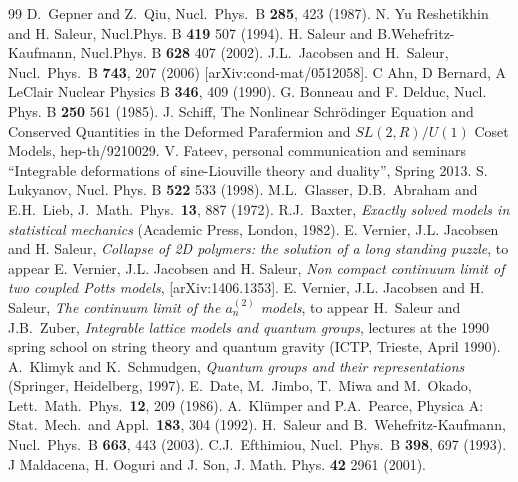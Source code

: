 \documentclass[11pt]{article}
\begin{document}
\begin{thebibliography}{99}
 D.\ Gepner and Z.\ Qiu,
 Nucl.\ Phys.\ B {\bf 285}, 423 (1987).
  N. Yu Reshetikhin and H. Saleur, Nucl.Phys. B {\bf 419} 507 (1994).
   H. Saleur and  B.Wehefritz-Kaufmann, Nucl.Phys. B {\bf 628} 407 (2002).
 J.L.\ Jacobsen and H.\ Saleur,
 Nucl.\ Phys.\ B {\bf 743}, 207 (2006) [arXiv:cond-mat/0512058].
   C Ahn, D Bernard, A LeClair
Nuclear Physics B {\bf 346}, 409 (1990).
 G. Bonneau and F. Delduc, Nucl. Phys. B {\bf 250} 561 (1985).
 J. Schiff, The Nonlinear Schr\"odinger Equation and Conserved Quantities in the Deformed Parafermion and $SL (2, R)/U (1)$ Coset Models, hep-th/9210029.
   V. Fateev, personal communication and seminars ``Integrable deformations of sine-Liouville theory and duality'', Spring 2013.
 S. Lukyanov, Nucl. Phys. B {\bf 522} 533 (1998).
 M.L.\ Glasser, D.B.\ Abraham and E.H.\ Lieb,
 J.\ Math.\ Phys.\ {\bf 13}, 887 (1972).
 R.J.\ Baxter, {\em Exactly solved models in statistical mechanics}
 (Academic Press, London, 1982).
  E. Vernier, J.L. Jacobsen and H. Saleur, {\em Collapse of 2D polymers: the solution of a long standing puzzle}, to appear 
 E. Vernier, J.L. Jacobsen and H. Saleur, {\em Non compact continuum limit of two coupled Potts models}, [arXiv:1406.1353].
 E. Vernier, J.L. Jacobsen and H. Saleur, {\em The continuum limit of the $a_n^{(2)}$ models}, to appear 
 H.\ Saleur and J.B.\ Zuber, {\em Integrable lattice models and quantum groups},
 lectures at the 1990 spring school on string theory and quantum gravity (ICTP, Trieste, April 1990).
 A.\ Klimyk and K.\ Schmudgen, {\em Quantum groups and their representations} (Springer, Heidelberg, 1997).
 E.\ Date, M.\ Jimbo, T.\ Miwa and M.\ Okado,
 Lett.\ Math.\ Phys.\ {\bf 12}, 209 (1986).
  A.\ Kl\"umper and P.A.\ Pearce,
 Physica A: Stat.\ Mech.\ and Appl.\ {\bf 183}, 304 (1992).
 H.\ Saleur and B.\ Wehefritz-Kaufmann,
 Nucl.\ Phys.\ B {\bf 663}, 443 (2003).
 C.J.\ Efthimiou,
 Nucl.\ Phys.\ B {\bf 398}, 697 (1993).
 J Maldacena, H. Ooguri and J. Son, J. Math. Phys. {\bf 42} 2961 (2001).


  
 
     \end{thebibliography}
\end{document}
